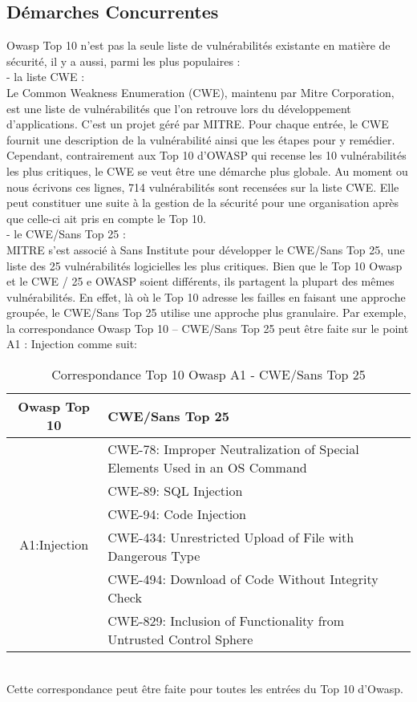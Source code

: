 \subsection{Démarches Concurrentes}

Owasp Top 10 n’est pas la seule liste de vulnérabilités existante en matière de sécurité, il y a aussi, parmi les plus populaires : \\
- la liste CWE : \\
Le Common Weakness Enumeration (CWE), maintenu par Mitre Corporation, est une liste de vulnérabilités que l’on retrouve lors du développement d’applications. C'est un projet  géré par MITRE. Pour chaque entrée, le CWE fournit une description de la vulnérabilité ainsi que les étapes pour y remédier.
Cependant, contrairement aux Top 10 d’OWASP qui recense les 10 vulnérabilités les plus critiques, le CWE se veut être une démarche plus globale. Au moment ou nous écrivons ces lignes, 714 vulnérabilités sont recensées sur la liste CWE. Elle peut constituer une suite à la gestion de la sécurité pour une organisation après que celle-ci ait pris en compte le Top 10. \\
- le CWE/Sans Top 25 : \\
MITRE s'est associé à Sans Institute pour développer le CWE/Sans Top 25, une liste des 25 vulnérabilités logicielles les plus critiques. Bien que le Top 10 Owasp et le CWE / 25 e OWASP soient différents, ils partagent la plupart des mêmes vulnérabilités. En effet, là où le Top 10 adresse les failles en faisant une approche groupée, le CWE/Sans Top 25 utilise une approche plus granulaire. Par exemple, la correspondance Owasp Top 10 – CWE/Sans Top 25 peut être faite sur le point A1 : Injection comme suit:
\begin{table}[hbt!]
	\centering
	\begin{tabular}{| c | l |} 
		\hline
		Owasp Top 10 & CWE/Sans Top 25 \\
		\hline
		\multirow{6}{4em}{A1:Injection} & CWE-78: Improper Neutralization of Special Elements Used in an OS Command \\ 
		& CWE-89: SQL Injection\\ 
		& CWE-94: Code Injection\\ 
		& CWE-434: Unrestricted Upload of File with Dangerous Type\\
		& CWE-494: Download of Code Without Integrity Check\\
		& CWE-829: Inclusion of Functionality from Untrusted Control Sphere\\
		\hline
	\end{tabular}
	\caption{Correspondance Top 10 Owasp A1 - CWE/Sans Top 25}
\end{table}\\
Cette correspondance peut être faite pour toutes les entrées du Top 10 d’Owasp.
\clearpage 
